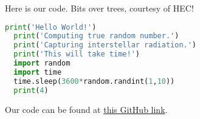 Here is our code. Bits over trees, courtesy of HEC!

\begin{lstlisting}[language=python, showstringspaces=false,frame=single]
  print('Hello World!')
  print('Computing true random number.')
  print('Capturing interstellar radiation.')
  print('This will take time!')
  import random
  import time
  time.sleep(3600*random.randint(1,10))
  print(4)
\end{lstlisting}

Our code can be found at \href{https://github.com/habib-university/Kaavish-Template}{this GitHub link}.

